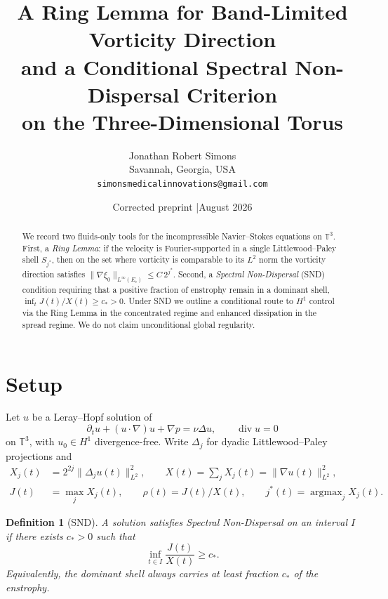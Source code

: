 \documentclass[11pt]{article}
\title{\textbf{A Ring Lemma for Band-Limited Vorticity Direction\\
and a Conditional Spectral Non-Dispersal Criterion}\\[6pt]
\large on the Three-Dimensional Torus}
\author{Jonathan Robert Simons\\
Savannah, Georgia, USA\\
\texttt{simonsmedicalinnovations@gmail.com}}
\date{Corrected preprint \quad|\quad August 2026}
\newtheorem{definition}[theorem]{Definition}
\begin{document}
\maketitle

\begin{center}
\end{center}
\vspace{0.75em}

\begin{abstract}
We record two fluids-only tools for the incompressible Navier--Stokes equations on
$\mathbb{T}^3$. First, a \emph{Ring Lemma}: if the velocity is Fourier-supported in a
single Littlewood--Paley shell $S_{j^*}$, then on the set where vorticity is comparable
to its $L^2$ norm the vorticity direction satisfies
$\|\nabla\xi_0\|_{L^\infty(E_c)}\le C\,2^{j^*}$. Second, a \emph{Spectral Non-Dispersal}
(SND) condition requiring that a positive fraction of enstrophy remain in a dominant
shell, $\inf_t J(t)/X(t)\ge c_*>0$. Under SND we outline a conditional route to
$H^1$ control via the Ring Lemma in the concentrated regime and enhanced dissipation
in the spread regime. We do not claim unconditional global regularity.
\end{abstract}

\section{Setup}

Let $u$ be a Leray--Hopf solution of
\[
\partial_t u+(u\cdot\nabla)u+\nabla p=\nu\Delta u,\qquad \operatorname{div}u=0
\]
on $\mathbb{T}^3$, with $u_0\in H^1$ divergence-free. Write $\Delta_j$ for dyadic
Littlewood--Paley projections and
\begin{align*}
X_j(t)&=2^{2j}\|\Delta_j u(t)\|_{L^2}^2,\qquad
X(t)=\sum_j X_j(t)=\|\nabla u(t)\|_{L^2}^2,\\
J(t)&=\max_j X_j(t),\qquad
\rho(t)=J(t)/X(t),\qquad
j^*(t)=\operatorname{argmax}_j X_j(t).
\end{align*}

\begin{definition}[SND]
A solution satisfies \emph{Spectral Non-Dispersal} on an interval $I$ if there exists
$c_*>0$ such that
\[
\inf_{t\in I}\frac{J(t)}{X(t)}\ge c_*.
\]
Equivalently, the dominant shell always carries at least fraction $c_*$ of the enstrophy.
\end{definition}
\end{document}
